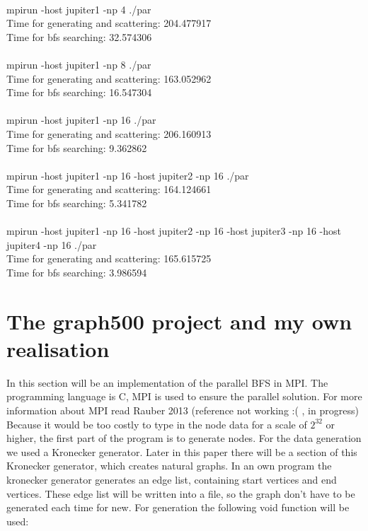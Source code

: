 \documentclass[12pt,a4paper]{article}
\begin{document}
\\
mpirun -host jupiter1 -np 4 ./par\\
Time for generating and scattering: 204.477917\\
Time for bfs searching: 32.574306\\
\\
mpirun -host jupiter1 -np 8 ./par\\
Time for generating and scattering: 163.052962\\
Time for bfs searching: 16.547304\\
\\
mpirun -host jupiter1 -np 16 ./par\\
Time for generating and scattering: 206.160913\\
Time for bfs searching: 9.362862\\
\\
mpirun -host jupiter1 -np 16 -host jupiter2 -np 16 ./par\\
Time for generating and scattering: 164.124661\\
Time for bfs searching: 5.341782\\
\\
mpirun -host jupiter1 -np 16 -host jupiter2 -np 16 -host jupiter3 -np 16 -host jupiter4 -np 16 ./par\\
Time for generating and scattering: 165.615725\\
Time for bfs searching: 3.986594\\


\section{The graph500 project and my own realisation}
\label{sec:graph500}

In this section will be an implementation of the parallel BFS in MPI. The programming language is C, MPI is used to ensure the parallel solution. For more information about MPI read Rauber 2013 (reference not working :( , in progress)\\
Because it would be too costly to type in the node data for a scale of \(2^{32}\) or higher, the first part of the program is to generate nodes. For the data generation we used a Kronecker generator. Later in this paper there will be a section of this Kronecker generator, which creates natural graphs. In an own program the kronecker generator generates an edge list, containing start vertices and end vertices. These edge list will be written into a file, so the graph don't have to be generated each time for new. For generation the following void function will be used:
\end{document}
